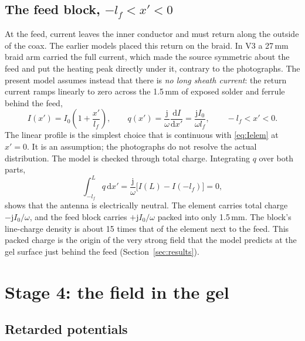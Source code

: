 \documentclass[11pt,a4paper]{article}
\newcommand{\dd}{\mathrm{d}}
\newcommand{\jj}{\mathrm{j}}
\begin{document}
\subsection{The feed block, $-l_f<x'<0$}

At the feed, current leaves the inner conductor and must return along the outside of the coax. The earlier
models placed this return on the braid. In V3 a 27\,mm braid arm carried the full current, which made the
source symmetric about the feed and put the heating peak directly under it, contrary to the photographs.
The present model assumes instead that there is \emph{no long sheath current}: the return current ramps
linearly to zero across the 1.5\,mm of exposed solder and ferrule behind the feed,
\begin{equation}
  I(x') = I_0\left(1+\frac{x'}{l_f}\right), \qquad
  q(x') = \frac{\jj}{\omega}\frac{\dd I}{\dd x'} = \frac{\jj I_0}{\omega l_f},
  \qquad -l_f<x'<0 .
  \label{eq:block}
\end{equation}
The linear profile is the simplest choice that is continuous with \eqref{eq:Ielem} at $x'=0$. It is an
assumption; the photographs do not resolve the actual distribution. The model is checked through total
charge. Integrating $q$ over both parts,
\begin{equation}
  \int_{-l_f}^{L} q\,\dd x' = \frac{\jj}{\omega}\Big[I(L) - I(-l_f)\Big] = 0 ,
\end{equation}
shows that the antenna is electrically neutral. The element carries total charge $-\jj I_0/\omega$, and the
feed block carries $+\jj I_0/\omega$ packed into only 1.5\,mm. The block's line-charge density is about 15
times that of the element next to the feed. This packed charge is the origin of the very strong field that
the model predicts at the gel surface just behind the feed (Section~\ref{sec:results}).

\section{Stage 4: the field in the gel}\label{sec:field}

\subsection{Retarded potentials}
\end{document}
